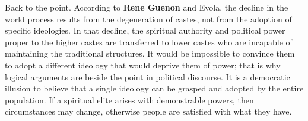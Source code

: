 Back to the point. According to \textbf{Rene Guenon} and Evola, the decline in the world process results from the degeneration of castes, not from the adoption of specific ideologies. In that decline, the spiritual authority and political power proper to the higher castes are transferred to lower castes who are incapable of maintaining the traditional structures. It would be impossible to convince them to adopt a different ideology that would deprive them of power; that is why logical arguments are beside the point in political discourse. It is a democratic illusion to believe that a single ideology can be grasped and adopted by the entire population. If a spiritual elite arises with demonstrable powers, then circumstances may change, otherwise people are satisfied with what they have.

